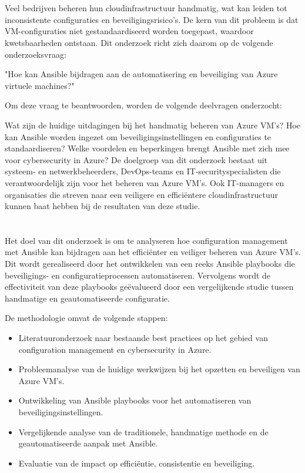 \section{}%
\label{sec:probleemstelling en onderzoeksvraag}

Veel bedrijven beheren hun cloudinfrastructuur handmatig, wat kan leiden tot inconsistente configuraties en beveiligingsrisico's.
De kern van dit probleem is dat VM-configuraties niet gestandaardiseerd worden toegepast, waardoor kwetsbaarheden ontstaan.
Dit onderzoek richt zich daarom op de volgende onderzoeksvraag:

"Hoe kan Ansible bijdragen aan de automatisering en beveiliging van Azure virtuele machines?"

Om deze vraag te beantwoorden, worden de volgende deelvragen onderzocht:

Wat zijn de huidige uitdagingen bij het handmatig beheren van Azure VM's?
Hoe kan Ansible worden ingezet om beveiligingsinstellingen en configuraties te standaardiseren?
Welke voordelen en beperkingen brengt Ansible met zich mee voor cybersecurity in Azure?
De doelgroep van dit onderzoek bestaat uit systeem- en netwerkbeheerders, DevOps-teams en IT-securityspecialisten die verantwoordelijk zijn voor het beheren van Azure VM's.
Ook IT-managers en organisaties die streven naar een veiligere en efficiëntere cloudinfrastructuur kunnen baat hebben bij de resultaten van deze studie.

\section{}%
\label{sec:onderzoeksdoelstelling}

Het doel van dit onderzoek is om te analyseren hoe configuration management met Ansible kan bijdragen aan het efficiënter en veiliger beheren van Azure VM's.
Dit wordt gerealiseerd door het ontwikkelen van een reeks Ansible playbooks die beveiligings- en configuratieprocessen automatiseren.
Vervolgens wordt de effectiviteit van deze playbooks geëvalueerd door een vergelijkende studie tussen handmatige en geautomatiseerde configuratie.

De methodologie omvat de volgende stappen:

\begin{itemize}
  \item Literatuuronderzoek naar bestaande best practices op het gebied van configuration management en cybersecurity in Azure.
  \item Probleemanalyse van de huidige werkwijzen bij het opzetten en beveiligen van Azure VM's.
  \item Ontwikkeling van Ansible playbooks voor het automatiseren van beveiligingsinstellingen.
  \item Vergelijkende analyse van de traditionele, handmatige methode en de geautomatiseerde aanpak met Ansible.
  \item Evaluatie van de impact op efficiëntie, consistentie en beveiliging.
\end{itemize}

